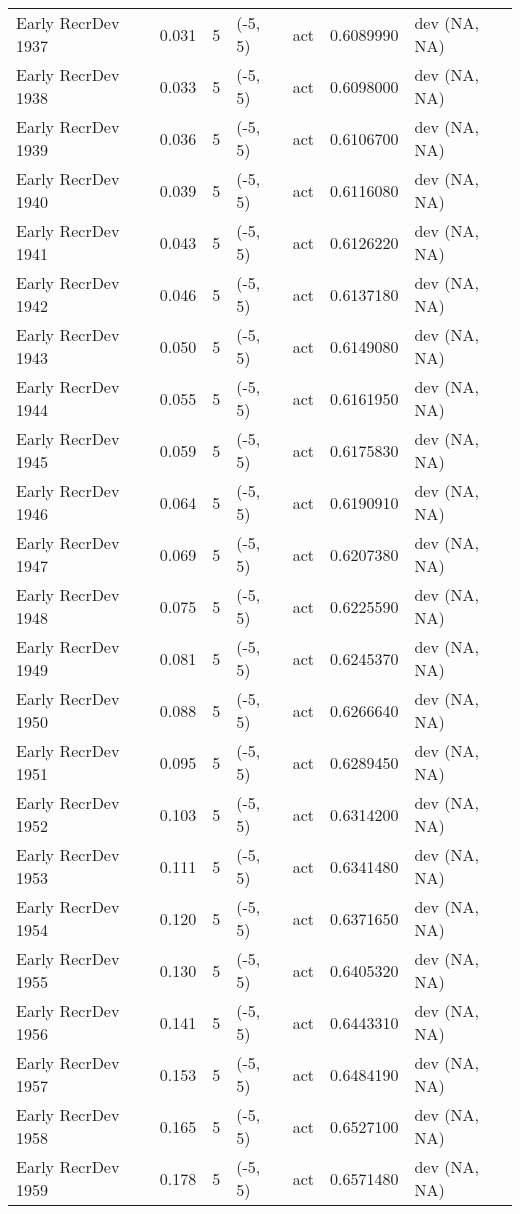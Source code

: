 \documentclass[11pt,
  english,
  a4paper,
]{article}
\begin{document}
\begin{landscape}
\begin{longtable}[t]{>{\raggedright\arraybackslash}p{8.5cm}lllll>{\raggedright\arraybackslash}p{4cm}}
Early RecrDev 1937 & 0.031 & 5 & (-5, 5) & act & 0.6089990 & dev (NA, NA)\\
Early RecrDev 1938 & 0.033 & 5 & (-5, 5) & act & 0.6098000 & dev (NA, NA)\\
Early RecrDev 1939 & 0.036 & 5 & (-5, 5) & act & 0.6106700 & dev (NA, NA)\\
Early RecrDev 1940 & 0.039 & 5 & (-5, 5) & act & 0.6116080 & dev (NA, NA)\\
Early RecrDev 1941 & 0.043 & 5 & (-5, 5) & act & 0.6126220 & dev (NA, NA)\\
Early RecrDev 1942 & 0.046 & 5 & (-5, 5) & act & 0.6137180 & dev (NA, NA)\\
Early RecrDev 1943 & 0.050 & 5 & (-5, 5) & act & 0.6149080 & dev (NA, NA)\\
Early RecrDev 1944 & 0.055 & 5 & (-5, 5) & act & 0.6161950 & dev (NA, NA)\\
Early RecrDev 1945 & 0.059 & 5 & (-5, 5) & act & 0.6175830 & dev (NA, NA)\\
Early RecrDev 1946 & 0.064 & 5 & (-5, 5) & act & 0.6190910 & dev (NA, NA)\\
Early RecrDev 1947 & 0.069 & 5 & (-5, 5) & act & 0.6207380 & dev (NA, NA)\\
Early RecrDev 1948 & 0.075 & 5 & (-5, 5) & act & 0.6225590 & dev (NA, NA)\\
Early RecrDev 1949 & 0.081 & 5 & (-5, 5) & act & 0.6245370 & dev (NA, NA)\\
Early RecrDev 1950 & 0.088 & 5 & (-5, 5) & act & 0.6266640 & dev (NA, NA)\\
Early RecrDev 1951 & 0.095 & 5 & (-5, 5) & act & 0.6289450 & dev (NA, NA)\\
Early RecrDev 1952 & 0.103 & 5 & (-5, 5) & act & 0.6314200 & dev (NA, NA)\\
Early RecrDev 1953 & 0.111 & 5 & (-5, 5) & act & 0.6341480 & dev (NA, NA)\\
Early RecrDev 1954 & 0.120 & 5 & (-5, 5) & act & 0.6371650 & dev (NA, NA)\\
Early RecrDev 1955 & 0.130 & 5 & (-5, 5) & act & 0.6405320 & dev (NA, NA)\\
Early RecrDev 1956 & 0.141 & 5 & (-5, 5) & act & 0.6443310 & dev (NA, NA)\\
Early RecrDev 1957 & 0.153 & 5 & (-5, 5) & act & 0.6484190 & dev (NA, NA)\\
Early RecrDev 1958 & 0.165 & 5 & (-5, 5) & act & 0.6527100 & dev (NA, NA)\\
Early RecrDev 1959 & 0.178 & 5 & (-5, 5) & act & 0.6571480 & dev (NA, NA)\\

\end{longtable}
\end{landscape}
\end{document}
